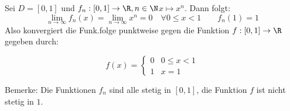 \begin{example}
    Sei $D= [0,1]$ und $f_n: [0,1] \to \R, n \in \N$\quad $x \mapsto x^n$. Dann folgt:
    \begin{equation*}
        \lim_{n \to \infty} f_n (x) = \lim_{n \to \infty} x^n = 0 \quad \forall 0 \leq x < 1 \qquad f_n (1) = 1
    \end{equation*}
    Also konvergiert die Funk.folge punktweise gegen die Funktion $f: [0,1] \to \R$ gegeben durch:
    \begin{center}
        \begin{minipage}{0.48\linewidth}
            \begin{equation*}
                f(x) = \begin{cases}
                    0 & 0 \leq x < 1\\
                    1 & x = 1
                \end{cases}
            \end{equation*}
        \end{minipage}
        \hfill
        \begin{minipage}{0.48\linewidth}
            Bemerke: Die Funktionen $f_n$ sind alle stetig in $[0,1]$, die Funktion $f$ ist nicht stetig in $1$.
        \end{minipage}
    \end{center}
\end{example} 